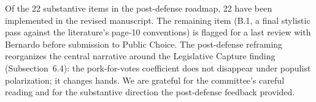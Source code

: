 \documentclass[11pt]{article}
\begin{document}
Of the 22 substantive items in the post-defense roadmap, 22 have been
implemented in the revised manuscript. The remaining item (B.1, a
final stylistic pass against the literature's page-10 conventions) is
flagged for a last review with Bernardo before submission to Public
Choice. The post-defense reframing reorganizes the central narrative
around the Legislative Capture finding (Subsection~6.4): the
pork-for-votes coefficient does not disappear under populist
polarization; it changes hands. We are grateful for the committee's
careful reading and for the substantive direction the post-defense
feedback provided.
\end{document}

